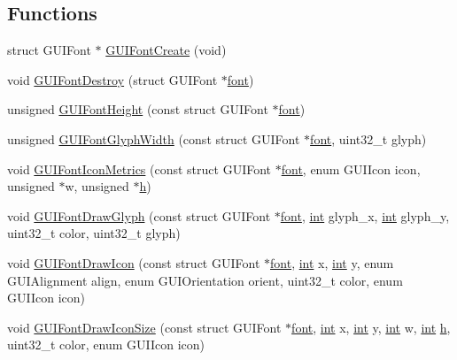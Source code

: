 \subsection*{Functions}
\begin{DoxyCompactItemize}
\item 
struct G\+U\+I\+Font $\ast$ \mbox{\hyperlink{3ds_2gui-font_8c_afeda865aa70118eb5e13639aeea185e5}{G\+U\+I\+Font\+Create}} (void)
\item 
void \mbox{\hyperlink{3ds_2gui-font_8c_aa30d3bddfd055be2a203306973eb2b6a}{G\+U\+I\+Font\+Destroy}} (struct G\+U\+I\+Font $\ast$\mbox{\hyperlink{wii_2main_8c_adae3f41cbe0ea5e886715661bb739691}{font}})
\item 
unsigned \mbox{\hyperlink{3ds_2gui-font_8c_a6d539c7b23450b8918bb6499e2c11042}{G\+U\+I\+Font\+Height}} (const struct G\+U\+I\+Font $\ast$\mbox{\hyperlink{wii_2main_8c_adae3f41cbe0ea5e886715661bb739691}{font}})
\item 
unsigned \mbox{\hyperlink{3ds_2gui-font_8c_a4b38c72440f93dd3f4c6d01848a23203}{G\+U\+I\+Font\+Glyph\+Width}} (const struct G\+U\+I\+Font $\ast$\mbox{\hyperlink{wii_2main_8c_adae3f41cbe0ea5e886715661bb739691}{font}}, uint32\+\_\+t glyph)
\item 
void \mbox{\hyperlink{3ds_2gui-font_8c_a70534a7637eda192a15884d8930a61b8}{G\+U\+I\+Font\+Icon\+Metrics}} (const struct G\+U\+I\+Font $\ast$\mbox{\hyperlink{wii_2main_8c_adae3f41cbe0ea5e886715661bb739691}{font}}, enum G\+U\+I\+Icon icon, unsigned $\ast$w, unsigned $\ast$\mbox{\hyperlink{isa-lr35902_8c_a06a62682361411df32cf88f75a0b8da4}{h}})
\item 
void \mbox{\hyperlink{3ds_2gui-font_8c_a6afd907275ce70a3b44246e55bb9eb99}{G\+U\+I\+Font\+Draw\+Glyph}} (const struct G\+U\+I\+Font $\ast$\mbox{\hyperlink{wii_2main_8c_adae3f41cbe0ea5e886715661bb739691}{font}}, \mbox{\hyperlink{ioapi_8h_a787fa3cf048117ba7123753c1e74fcd6}{int}} glyph\+\_\+x, \mbox{\hyperlink{ioapi_8h_a787fa3cf048117ba7123753c1e74fcd6}{int}} glyph\+\_\+y, uint32\+\_\+t color, uint32\+\_\+t glyph)
\item 
void \mbox{\hyperlink{3ds_2gui-font_8c_a89adf10a0ec4d3b2dfba92b95ab17ad5}{G\+U\+I\+Font\+Draw\+Icon}} (const struct G\+U\+I\+Font $\ast$\mbox{\hyperlink{wii_2main_8c_adae3f41cbe0ea5e886715661bb739691}{font}}, \mbox{\hyperlink{ioapi_8h_a787fa3cf048117ba7123753c1e74fcd6}{int}} x, \mbox{\hyperlink{ioapi_8h_a787fa3cf048117ba7123753c1e74fcd6}{int}} y, enum G\+U\+I\+Alignment align, enum G\+U\+I\+Orientation orient, uint32\+\_\+t color, enum G\+U\+I\+Icon icon)
\item 
void \mbox{\hyperlink{3ds_2gui-font_8c_ae9ac7ef646aad8e77b04baf500472178}{G\+U\+I\+Font\+Draw\+Icon\+Size}} (const struct G\+U\+I\+Font $\ast$\mbox{\hyperlink{wii_2main_8c_adae3f41cbe0ea5e886715661bb739691}{font}}, \mbox{\hyperlink{ioapi_8h_a787fa3cf048117ba7123753c1e74fcd6}{int}} x, \mbox{\hyperlink{ioapi_8h_a787fa3cf048117ba7123753c1e74fcd6}{int}} y, \mbox{\hyperlink{ioapi_8h_a787fa3cf048117ba7123753c1e74fcd6}{int}} w, \mbox{\hyperlink{ioapi_8h_a787fa3cf048117ba7123753c1e74fcd6}{int}} \mbox{\hyperlink{isa-lr35902_8c_a06a62682361411df32cf88f75a0b8da4}{h}}, uint32\+\_\+t color, enum G\+U\+I\+Icon icon)
\end{DoxyCompactItemize}


